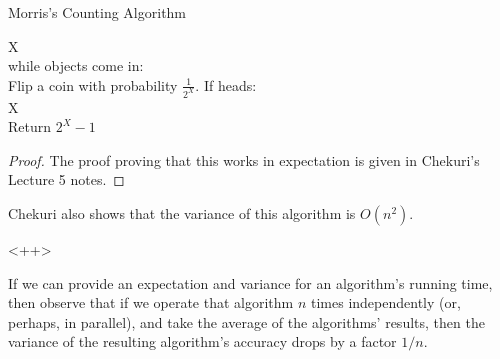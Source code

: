 \documentclass[../main.tex]{subfiles}
\begin{document}
\begin{definition}{Morris's Counting Algorithm}

    \begin{algo}
        X  \\
        while objects come in: \+\\
        Flip a coin with probability $\frac{1}{2^{X}}$.
        If heads: \+\\
        X  \-\-\\
        Return $2^{X} - 1$ \\
    \end{algo}
    
\end{definition}
\begin{proof}
    The proof proving that this works in expectation is
    given in Chekuri's Lecture 5 notes.
\end{proof}

\begin{remark}
    Chekuri also shows that the variance of this algorithm is $O(n^2)$.
\end{remark}<++>

\begin{remark}
    If we can provide an expectation and variance for an algorithm's running time, then observe that if we operate that algorithm $n$ times independently (or, perhaps, in parallel), and take the average of the algorithms' results, then the variance of the resulting algorithm's accuracy drops by a factor $1/n$.
\end{remark}
\end{document}
